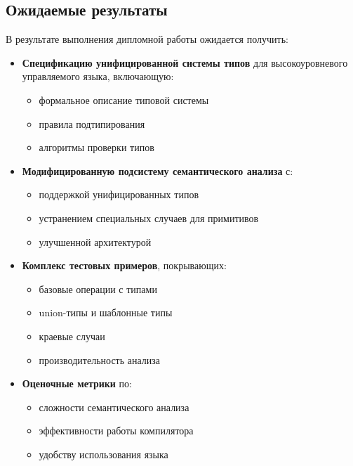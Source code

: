 \subsection{Ожидаемые результаты}
В результате выполнения дипломной работы ожидается получить:

\begin{itemize}
    \item \textbf{Спецификацию унифицированной системы типов} для высокоуровневого управляемого языка, включающую:
    \begin{itemize}[label={--}]
        \item формальное описание типовой системы
        \item правила подтипирования
        \item алгоритмы проверки типов
    \end{itemize}

    \item \textbf{Модифицированную подсистему семантического анализа} с:
    \begin{itemize}[label={--}]
        \item поддержкой унифицированных типов
        \item устранением специальных случаев для примитивов
        \item улучшенной архитектурой
    \end{itemize}

    \item \textbf{Комплекс тестовых примеров}, покрывающих:
    \begin{itemize}[label={--}]
        \item базовые операции с типами
        \item union-типы и шаблонные типы
        \item краевые случаи
        \item производительность анализа
    \end{itemize}

    \item \textbf{Оценочные метрики} по:
    \begin{itemize}[label={--}]
        \item сложности семантического анализа
        \item эффективности работы компилятора
        \item удобству использования языка
    \end{itemize}
\end{itemize}

\newpage
